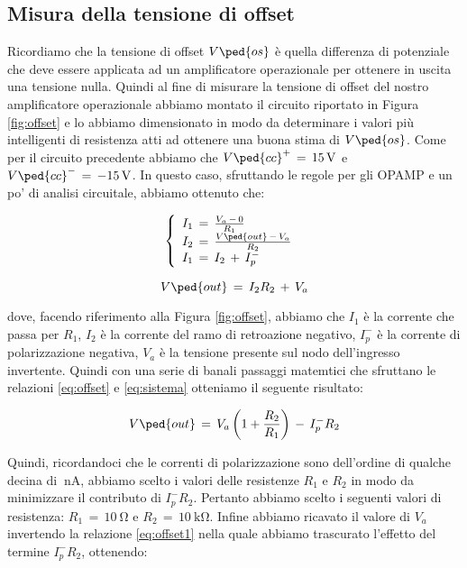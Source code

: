 \subsection*{Misura della tensione di offset}

Ricordiamo che la tensione di offset $V\ped{os}$ è quella differenza di potenziale che deve essere applicata ad un amplificatore operazionale per ottenere in uscita una tensione nulla.
Quindi al fine di misurare la tensione di offset del nostro amplificatore operazionale abbiamo montato il circuito riportato in Figura \ref{fig:offset} e lo abbiamo dimensionato in modo da determinare i valori più intelligenti di resistenza atti ad ottenere una buona stima di $V\ped{os}$.
Come per il circuito precedente abbiamo che $V\ped{cc}^+\,=\,\SI{+15}{\volt}$ e $V\ped{cc}^-\,=\,\SI{-15}{\volt}$.
In questo caso, sfruttando le regole per gli OPAMP e un po' di analisi circuitale, abbiamo ottenuto che:

\begin{equation}
	\left\{
  \begin{array}{l l l}
    I_1\,=\,\frac{V_a\,-\,0}{R_1}\\
    I_2\,=\,\frac{V\ped{out}\,-\,V_a}{R_2}\\
    I_1\,=\,I_2\,+\,I_{p}^-
  \end{array} \right.\
  \label{eq:sistema}
\end{equation}

\begin{equation}
	V\ped{out}\,=\,I_2R_2\,+\,V_a
	\label{eq:offset}
\end{equation}

dove, facendo riferimento alla Figura \ref{fig:offset}, abbiamo che $I_1$ è la corrente che passa per $R_1$, $I_2$ è la corrente del ramo di retroazione negativo, $I_{p}^-$ è la corrente di polarizzazione negativa, $V_a$ è la tensione presente sul nodo dell'ingresso invertente.
Quindi con una serie di banali passaggi matemtici che sfruttano le relazioni \ref{eq:offset} e \ref{eq:sistema} otteniamo il seguente risultato:

\begin{equation}
	V\ped{out}\,=\,V_a\left(1+\frac{R_2}{R_1}\right)\,-\,I_{p}^-R_2
	\label{eq:offset1}
\end{equation}

Quindi, ricordandoci che le correnti di polarizzazione sono dell'ordine di qualche decina di $\SI{}{\nano\ampere}$, abbiamo scelto i valori delle resistenze $R_1$ e $R_2$ in modo da minimizzare il contributo di $I_{p}^-R_2$. Pertanto abbiamo scelto i seguenti valori di resistenza: $R_1\,=\,\SI{10}{\ohm}$ e $R_2\,=\,\SI{10}{\kilo\ohm}$.
Infine abbiamo ricavato il valore di $V_a$ invertendo la relazione \ref{eq:offset1} nella quale abbiamo trascurato l'effetto del termine $I_{p}^-R_2$, ottenendo:

